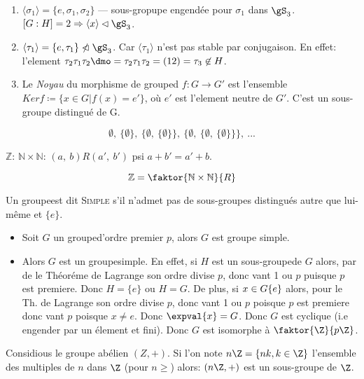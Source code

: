 \begin{examplebox}
	\begin{enumerate}
		\item $\langle \sigma_1 \rangle=\{e,\sigma_1,\sigma_2\}$ --- sous-gropupe engendée pour $\sigma_1$ dans $\gS_3$. $[G:H]=2\Rightarrow \langle x\rangle\lhd\gS_3$.
		\item $\langle \tau_1\rangle=\{e,\tau_1\}\ntriangleleft\gS_3$. Car $\langle \tau_1 \rangle$ n'est pas stable par conjugaison. En effet: l'element $\tau_2\tau_1\tau_2\dmo =\tau_2\tau_1\tau_2=(12)=\tau_3\not\in H$.
		\item Le \emph{Noyau} du morphisme de grouped $f:G\rightarrow G'$ est l'ensemble $Ker f\coloneq\{x\in G | f(x)=e'\}$, où $e'$ est l'element neutre de $G'$. C'est un sous-groupe distingué de G.
	\end{enumerate}
\end{examplebox}

\ifcomment
$$\emptyset,\ \{\emptyset\},\ \{\emptyset,\ \{\emptyset\}\},\ \{\emptyset,\ \{\emptyset,\ \{\emptyset\}\}\},\ ...$$

$\mathbb{Z}$: $\mathbb{N}\times\mathbb{N}$:
$(a,\ b)R(a',\ b')$ psi $a+b'=a' + b$.

$$\mathbb{Z}=\faktor{\mathbb{N}\times\mathbb{N}}{R}$$
\fi


\begin{definition}
	Un groupeest dit \textsc{Simple} s'il n'admet pas de sous-groupes distingués autre que lui-même et $\{e\}$.
\end{definition}

\begin{examplebox}
	\begin{itemize}
		\item Soit $G$ un grouped'ordre premier $p$, alors $G$ est groupe simple.
		\item Alors $G$ est un groupesimple. En effet, si $H$ est un sous-groupede $G$ alors, par de le Théoréme de Lagrange son ordre divise $p$, donc vant 1 ou $p$ puisque $p$ est premiere. Donc $H=\{e\}$ ou $H=G$. De plus, si $x\in G\\ \{e\}$ alors, pour le Th. de Lagrange son ordre divise $p$, donc vant 1 ou $p$ poisque $p$ est premiere donc vant $p$ poisque $x\neq e$. Donc $\expval{x}=G$. Donc $G$ est cyclique (i.e engender par un élement et fini). Donc $G$ est isomorphe à $\faktor{\Z}{p\Z}$.
	\end{itemize}
\end{examplebox}

Considious le groupe abélien $(Z, +)$. Si l'on note $n\Z=\{nk, k\in\Z\}$ l'ensemble des multiples de $n$ dans $\Z$ (pour $n\geq$) alors: $(n\Z,+)$ est un sous-groupe de $\Z$.


